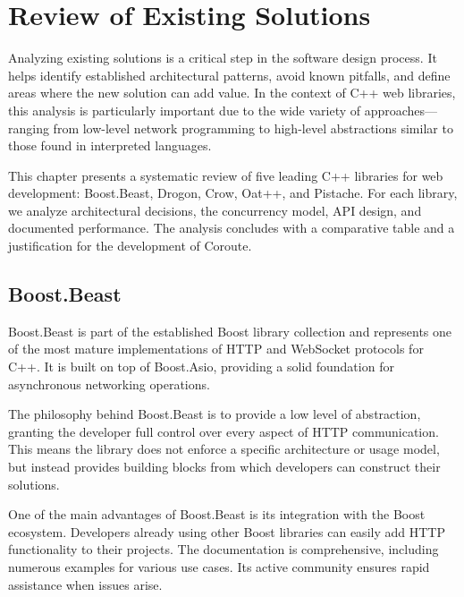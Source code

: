 \section{Review of Existing Solutions}
\label{sec:existing_solutions}

Analyzing existing solutions is a critical step in the software design process. It helps identify established architectural patterns, avoid known pitfalls, and define areas where the new solution can add value. In the context of C++ web libraries, this analysis is particularly important due to the wide variety of approaches---ranging from low-level network programming to high-level abstractions similar to those found in interpreted languages.

This chapter presents a systematic review of five leading C++ libraries for web development: Boost.Beast, Drogon, Crow, Oat++, and Pistache. For each library, we analyze architectural decisions, the concurrency model, API design, and documented performance. The analysis concludes with a comparative table and a justification for the development of Coroute.

\subsection{Boost.Beast}

Boost.Beast \cite{boost_beast} is part of the established Boost library collection and represents one of the most mature implementations of HTTP and WebSocket protocols for C++. It is built on top of Boost.Asio, providing a solid foundation for asynchronous networking operations.

The philosophy behind Boost.Beast is to provide a low level of abstraction, granting the developer full control over every aspect of HTTP communication. This means the library does not enforce a specific architecture or usage model, but instead provides building blocks from which developers can construct their solutions.

One of the main advantages of Boost.Beast is its integration with the Boost ecosystem. Developers already using other Boost libraries can easily add HTTP functionality to their projects. The documentation is comprehensive, including numerous examples for various use cases. Its active community ensures rapid assistance when issues arise.

